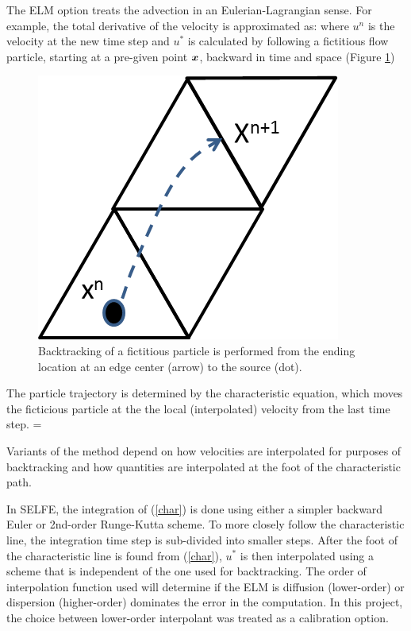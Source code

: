 The ELM option treats the advection in an Eulerian-Lagrangian sense. For example, the total derivative of the velocity is approximated as:
\beq
   \approx {}
\eeq
where $u^n$ is the velocity at the new time step and $u^*$ is calculated 
by following a fictitious flow particle, starting at a pre-given point $\boldsymbol{x}$, backward in time and space 
(Figure \ref{fig:backtrack})
\begin{figure}
	\centering
		\includegraphics[scale=1.0]{image/backtrack}
	\caption{Backtracking of a fictitious particle is performed from the ending location at an edge center 
	(arrow) to the source (dot).}
	\label{fig:backtrack}
\end{figure}

The particle trajectory is determined by the characteristic equation, which moves the ficticious particle at the
the local (interpolated) velocity from the last time step.
\beq
  = \label{char}
\eeq

Variants of the method depend on how velocities are interpolated for purposes of backtracking and how 
quantities are interpolated at the foot of the characteristic path. 
 
In SELFE, the integration of (\ref{char}) is done using either a simpler backward Euler 
or 2nd-order Runge-Kutta scheme. To more closely follow the characteristic line, 
the integration time step is sub-divided into smaller steps.  After the foot of the characteristic line is found from (\ref{char}), $u^*$ is then interpolated using a scheme that is independent of 
the one used for backtracking. The order of interpolation function
used will determine if the ELM is diffusion (lower-order) or dispersion (higher-order) dominates the
error in the computation. In this project, the choice between lower-order interpolant was treated
as a calibration option. 



